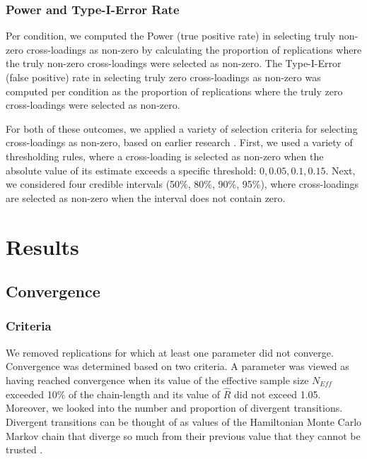 \documentclass[]{interact}
\theoremstyle{plain}%
\theoremstyle{definition}
\theoremstyle{remark}
\begin{document}
\hypertarget{power-and-type-i-error-rate}{%
\subsubsection{Power and Type-I-Error
Rate}\label{power-and-type-i-error-rate}}

Per condition, we computed the Power (true positive rate) in selecting
truly non-zero cross-loadings as non-zero by calculating the proportion
of replications where the truly non-zero cross-loadings were selected as
non-zero. The Type-I-Error (false positive) rate in selecting truly zero
cross-loadings as non-zero was computed per condition as the proportion
of replications where the truly zero cross-loadings were selected as
non-zero.

For both of these outcomes, we applied a variety of selection criteria
for selecting cross-loadings as non-zero, based on earlier research
\citep{zhang_criteria_2021}. First, we used a variety of thresholding
rules, where a cross-loading is selected as non-zero when the absolute
value of its estimate exceeds a specific threshold:
\(0, 0.05, 0.1, 0.15\). Next, we considered four credible intervals
(50\%, 80\%, 90\%, 95\%), where cross-loadings are selected as non-zero
when the interval does not contain zero.

\hypertarget{results}{%
\section{Results}\label{results}}

\hypertarget{convergence}{%
\subsection{Convergence}\label{convergence}}

\hypertarget{criteria}{%
\subsubsection{Criteria}\label{criteria}}

We removed replications for which at least one parameter did not
converge. Convergence was determined based on two criteria. A parameter
was viewed as having reached convergence when its value of the effective
sample size \(N_{Eff}\) exceeded 10\% of the chain-length and its value
of \(\hat{R}\) did not exceed 1.05. Moreover, we looked into the number
and proportion of divergent transitions. Divergent transitions can be
thought of as values of the Hamiltonian Monte Carlo Markov chain that
diverge so much from their previous value that they cannot be trusted
\citep[see][ for details]{betancourt_conceptual_2018}.
\end{document}
